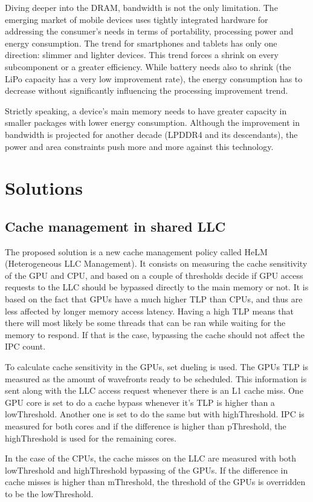 \documentclass[12pt,journal,compsoc]{IEEEtran}
\begin{document}
Diving deeper into the DRAM, bandwidth is not the only limitation. The emerging market of mobile devices uses tightly integrated hardware for addressing the consumer's needs in terms of portability, processing power and energy consumption. The trend for smartphones and tablets has only one direction: slimmer and lighter devices. This trend forces a shrink on every subcomponent or a greater efficiency. While battery needs also to shrink (the LiPo capacity has a very low improvement rate), the energy consumption has to decrease without significantly influencing the processing improvement trend. 

Strictly speaking, a device's main memory needs to have greater capacity in smaller packages with lower energy consumption. Although the improvement in bandwidth is projected for another decade (LPDDR4 and its descendants), the power and area constraints push more and more against this technology.

\section{Solutions}
\subsection{Cache management in shared LLC}
The proposed solution is a new cache management policy called HeLM (Heterogeneous LLC Management). It consists on measuring the cache sensitivity of the GPU and CPU, and based on a couple of thresholds decide if GPU access requests to the LLC should be bypassed directly to the main memory or not.
It is based on the fact that GPUs have a much higher TLP than CPUs, and thus are less affected by longer memory access latency. Having a high TLP means that there will most likely be some threads that can be ran while waiting for the memory to respond. If that is the case, bypassing the cache should not affect the IPC count.

To calculate cache sensitivity in the GPUs, set dueling is used. The GPUs TLP is measured as the amount of wavefronts ready to be scheduled. This information is sent along with the LLC access request whenever there is an L1 cache miss. One GPU core is set to do a cache bypass whenever it's TLP is higher than a lowThreshold. Another one is set to do the same but with highThreshold. IPC is measured for both cores and if the difference is higher than pThreshold, the highThreshold is used for the remaining cores.

In the case of the CPUs, the cache misses on the LLC are measured with both lowThreshold and highThreshold bypassing of the GPUs. If the difference in cache misses is higher than mThreshold, the threshold of the GPUs is overridden to be the lowThreshold.
\end{document}
